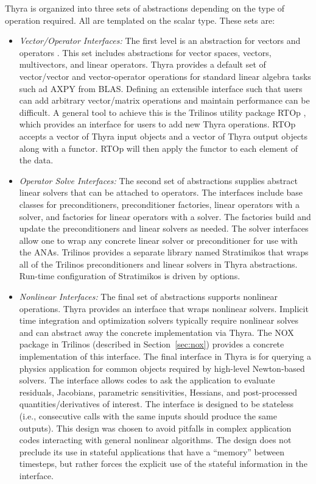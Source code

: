 Thyra is organized into three sets of abstractions depending on the type of operation required. All are templated on the scalar type. These sets are:
\begin{itemize}
\item \emph{Vector/Operator Interfaces:} The first level is an abstraction for vectors and operators \cite{Bartlett2007}. This set includes abstractions for vector spaces, vectors, multivectors, and linear operators. Thyra provides a default set of vector/vector and vector-operator operations for standard linear algebra tasks such ad AXPY from BLAS. Defining an extensible interface such that users can add arbitrary vector/matrix operations and maintain performance can be difficult. A general tool to achieve this is the Trilinos utility package RTOp \cite{rtop}, which provides an interface for users to add new Thyra operations. RTOp accepts a vector of Thyra input objects and a vector of Thyra output objects along with a functor. RTOp will then apply the functor to each element of the data.

\item \emph{Operator Solve Interfaces:} The second set of abstractions supplies abstract linear solvers that can be attached to operators. The interfaces include base classes for preconditioners, preconditioner factories, linear operators with a solver, and factories for linear operators with a solver. The factories build and update the preconditioners and linear solvers as needed. The solver interfaces allow one to wrap any concrete linear solver or preconditioner for use with the ANAs. Trilinos provides a separate library named Stratimikos that wraps all of the Trilinos preconditioners and linear solvers in Thyra abstractions. Run-time configuration of Stratimikos is driven by  options.

\item \emph{Nonlinear Interfaces:} The final set of abstractions supports nonlinear operations. Thyra provides an interface that wraps nonlinear solvers. Implicit time integration and optimization solvers typically require nonlinear solves and can abstract away the concrete implementation via Thyra. The NOX package in Trilinos (described in Section~\ref{sec:nox}) provides a concrete implementation of this interface. The final interface in Thyra is for querying a physics application for common objects required by high-level Newton-based solvers. The  interface allows codes to ask the application to evaluate residuals, Jacobians, parametric sensitivities, Hessians, and post-processed quantities/derivatives of interest. The interface is designed to be stateless (i.e., consecutive calls with the same inputs should produce the same outputs). This design was chosen to avoid pitfalls in complex application codes interacting with general nonlinear algorithms. The design does not preclude its use in stateful applications that have a ``memory'' between timesteps, but rather forces the explicit use of the stateful information in the interface.
\end{itemize}



